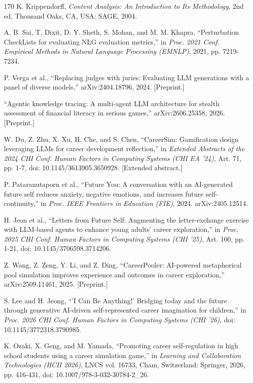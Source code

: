 \begin{thebibliography}{170}
 K. Krippendorff, \textit{Content Analysis: An Introduction to Its Methodology}, 2nd ed. Thousand Oaks, CA, USA: SAGE, 2004.

 A. B. Sai, T. Dixit, D. Y. Sheth, S. Mohan, and M. M. Khapra, ``Perturbation CheckLists for evaluating NLG evaluation metrics,'' in \textit{Proc. 2021 Conf. Empirical Methods in Natural Language Processing (EMNLP)}, 2021, pp. 7219-7234.

 P. Verga et al., ``Replacing judges with juries: Evaluating LLM generations with a panel of diverse models,'' arXiv:2404.18796, 2024. [Preprint.]

 ``Agentic knowledge tracing: A multi-agent LLM architecture for stealth assessment of financial literacy in serious games,'' arXiv:2606.25358, 2026. [Preprint.]

 W. Du, Z. Zhu, X. Xu, H. Che, and S. Chen, ``CareerSim: Gamification design leveraging LLMs for career development reflection,'' in \textit{Extended Abstracts of the 2024 CHI Conf. Human Factors in Computing Systems (CHI EA '24)}, Art. 71, pp. 1-7, doi: 10.1145/3613905.3650928. [Extended abstract.]

 P. Pataranutaporn et al., ``Future You: A conversation with an AI-generated future self reduces anxiety, negative emotions, and increases future self-continuity,'' in \textit{Proc. IEEE Frontiers in Education (FIE)}, 2024. arXiv:2405.12514.

 H. Jeon et al., ``Letters from Future Self: Augmenting the letter-exchange exercise with LLM-based agents to enhance young adults' career exploration,'' in \textit{Proc. 2025 CHI Conf. Human Factors in Computing Systems (CHI '25)}, Art. 100, pp. 1-21, doi: 10.1145/3706598.3714206.

 Z. Wang, Z. Zeng, Y. Li, and Z. Ding, ``CareerPooler: AI-powered metaphorical pool simulation improves experience and outcomes in career exploration,'' arXiv:2509.11461, 2025. [Preprint.]

 S. Lee and H. Jeong, ``'I Can Be Anything!' Bridging today and the future through generative AI-driven self-represented career imagination for children,'' in \textit{Proc. 2026 CHI Conf. Human Factors in Computing Systems (CHI '26)}, doi: 10.1145/3772318.3790985.

 K. Ozaki, X. Geng, and M. Yamada, ``Promoting career self-regulation in high school students using a career simulation game,'' in \textit{Learning and Collaboration Technologies (HCII 2026)}, LNCS vol. 16733, Cham, Switzerland: Springer, 2026, pp. 416-431, doi: 10.1007/978-3-032-30784-2\_26.


\end{thebibliography}
